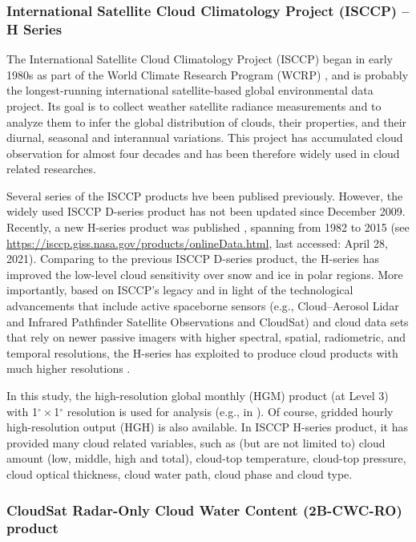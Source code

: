 \subsubsection{International Satellite Cloud Climatology Project (ISCCP) -- H Series}

The International Satellite Cloud Climatology Project (ISCCP)  began in early 1980s as part of the World Climate Research Program (WCRP) \citep{Schiffer1983,Rossow1991}, and is probably the longest-running international satellite-based global environmental data project. Its goal is to collect weather satellite radiance measurements and to analyze them to infer the global distribution of clouds, their properties, and their diurnal, seasonal and interannual variations. This project has accumulated cloud observation for almost four decades and has been therefore widely used in cloud related researches.

Several series of the ISCCP products hve been publised previously. However, the widely used ISCCP D-series product \citep{Rossow1999advances} has not been updated since December 2009. Recently, a new H-series product was published \citep{Young2018}, spanning from 1982 to 2015 (see \url{https://isccp.giss.nasa.gov/products/onlineData.html}, last accessed: April 28, 2021). Comparing to the previous ISCCP D-series product, the H-series has improved the low-level cloud sensitivity over snow and ice in polar regions. More importantly, based on ISCCP’s legacy and in light of the technological advancements that include active spaceborne sensors (e.g., Cloud–Aerosol Lidar and Infrared Pathfinder Satellite Observations and CloudSat) and cloud data sets that rely on newer passive imagers with higher spectral, spatial, radiometric, and temporal resolutions, the H-series has exploited to produce cloud products with much higher resolutions \citep{Young2018}.

In this study, the high-resolution global monthly (HGM) product (at Level 3) with 1$^\circ \times$1$^\circ$ resolution is used for analysis (e.g., in ). Of course, gridded hourly high-resolution output (HGH) is also available. In ISCCP H-series product, it has provided many cloud related variables, such as (but are not limited to) cloud amount (low, middle, high and total), cloud-top temperature, cloud-top pressure, cloud optical thickness, cloud water path, cloud phase and cloud type.

\subsubsection{CloudSat Radar-Only Cloud Water Content (2B-CWC-RO) product}

